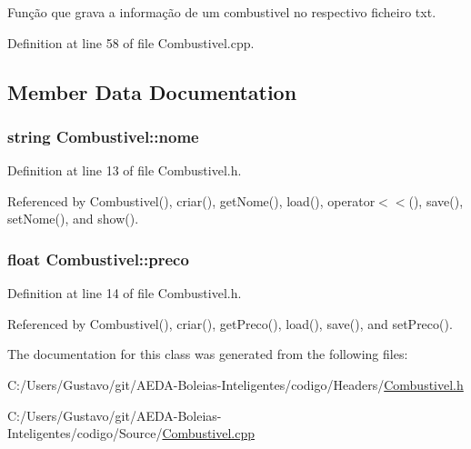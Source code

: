 Função que grava a informação de um combustivel no respectivo ficheiro txt. 



Definition at line 58 of file Combustivel.\+cpp.



\subsection{Member Data Documentation}
\hypertarget{class_combustivel_adfa329c4c4b60abcb87c1f3c82be4145}{
\subsubsection[{nome}]{\setlength{\rightskip}{0pt plus 5cm}string Combustivel\+::nome\hspace{0.3cm}{\ttfamily [private]}}}\label{class_combustivel_adfa329c4c4b60abcb87c1f3c82be4145}


Definition at line 13 of file Combustivel.\+h.



Referenced by Combustivel(), criar(), get\+Nome(), load(), operator$<$$<$(), save(), set\+Nome(), and show().

\hypertarget{class_combustivel_ac910a8410930ba553861f584da9f48d1}{
\subsubsection[{preco}]{\setlength{\rightskip}{0pt plus 5cm}float Combustivel\+::preco\hspace{0.3cm}{\ttfamily [private]}}}\label{class_combustivel_ac910a8410930ba553861f584da9f48d1}


Definition at line 14 of file Combustivel.\+h.



Referenced by Combustivel(), criar(), get\+Preco(), load(), save(), and set\+Preco().



The documentation for this class was generated from the following files\+:\begin{DoxyCompactItemize}
\item 
C\+:/\+Users/\+Gustavo/git/\+A\+E\+D\+A-\/\+Boleias-\/\+Inteligentes/codigo/\+Headers/\hyperlink{_combustivel_8h}{Combustivel.\+h}\item 
C\+:/\+Users/\+Gustavo/git/\+A\+E\+D\+A-\/\+Boleias-\/\+Inteligentes/codigo/\+Source/\hyperlink{_combustivel_8cpp}{Combustivel.\+cpp}\end{DoxyCompactItemize}
